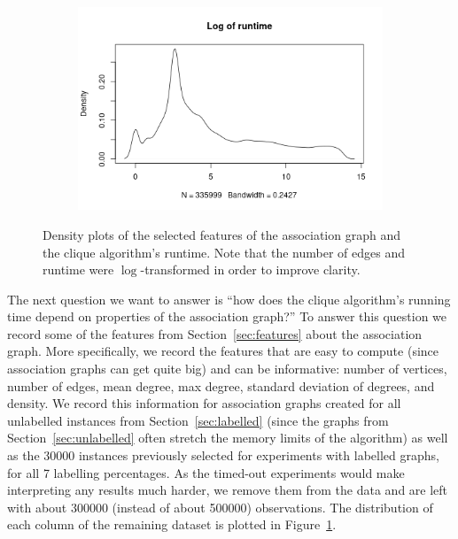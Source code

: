 \documentclass{l4proj}
\theoremstyle{definition}
\theoremstyle{remark}
\begin{document}
\begin{figure}
\begin{subfigure}[t]{0.49\textwidth}
  \end{subfigure}
  \begin{subfigure}[t]{0.49\textwidth}
    \centering
    \includegraphics[width=\textwidth]{images/time_density.png}
  \end{subfigure}
  \caption{Density plots of the selected features of the association graph and
    the clique algorithm's runtime. Note that the number of edges and runtime
    were $\log$-transformed in order to improve clarity.}
  \label{fig:densities}
\end{figure}

The next question we want to answer is ``how does the clique algorithm's running
time depend on properties of the association graph?'' To answer this question we
record some of the features from Section~\ref{sec:features} about the
association graph. More specifically, we record the features that are easy to
compute (since association graphs can get quite big) and can be informative:
number of vertices, number of edges, mean degree, max degree, standard deviation
of degrees, and density. We record this information for association graphs
created for all unlabelled instances from Section~\ref{sec:labelled} (since the
graphs from Section~\ref{sec:unlabelled} often stretch the memory limits of the
algorithm) as well as the \num{30000} instances previously selected for
experiments with labelled graphs, for all 7 labelling percentages. As the
timed-out experiments would make interpreting any results much harder, we remove
them from the data and are left with about \num{300000} (instead of about
\num{500000}) observations. The distribution of each column of the remaining
dataset is plotted in Figure~\ref{fig:densities}.
\end{document}
